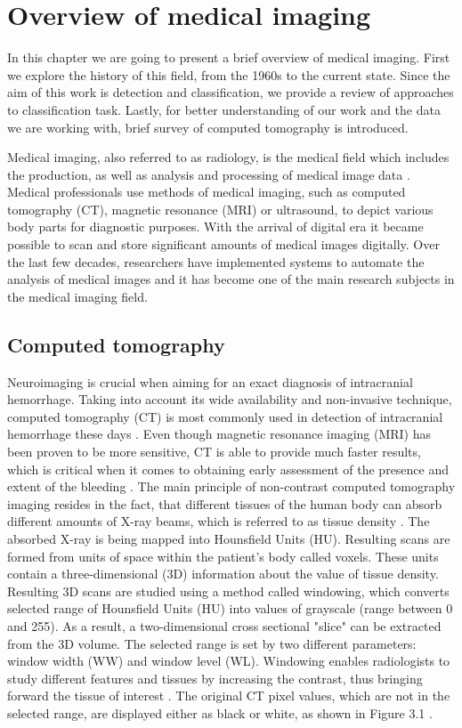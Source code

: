 \chapter{Overview of medical imaging}
In this chapter we are going to present a brief overview of medical imaging. First we explore the history of this field, from the 1960s to the current state. Since the aim of this work is detection and classification, we provide a review of approaches to classification task. Lastly, for better understanding of our work and the data we are working with, brief survey of computed tomography is introduced.

Medical imaging, also referred to as radiology, is the medical field which includes the production, as well as analysis and processing of medical image data \cite{diagnostic50years}. Medical professionals use methods of medical imaging, such as computed tomography (CT), magnetic resonance (MRI) or ultrasound, to depict various body parts for diagnostic purposes. With the arrival of digital era it became possible to scan and store significant amounts of medical images digitally. Over the last few decades, researchers have implemented systems to automate the analysis of medical images and it has become one of the main research subjects in the medical imaging field. 

\section{Computed tomography}
Neuroimaging is crucial when aiming for an exact diagnosis of intracranial hemorrhage.  Taking into account its wide availability and non-invasive technique, computed tomography (CT) is most commonly used in detection of intracranial hemorrhage these days \cite{imagingICH}. Even though magnetic resonance imaging (MRI) has been proven to be more sensitive, CT is able to provide much faster results, which is critical when it comes to obtaining early assessment of the presence and extent of the bleeding \cite{imagingAfterBrainInjury}. The main principle of non-contrast computed tomography imaging resides in the fact, that different tissues of the human body can absorb different amounts of X-ray beams, which is referred to as tissue density \cite{principlesOfCT}. The absorbed X-ray is being mapped into Hounsfield Units (HU). Resulting scans are formed from units of space within the patient's body called voxels. These units contain a three-dimensional (3D) information about the value of tissue density. Resulting 3D scans are studied using a method called windowing, which converts selected range of Hounsfield Units (HU) into values of grayscale (range between 0 and 255).  As a result, a two-dimensional cross sectional "slice" can be extracted from the 3D volume. The selected range is set by two different parameters: window width (WW) and window level (WL). Windowing enables radiologists to study different features and tissues by increasing the contrast, thus bringing forward the tissue of interest \cite{windowClassBiomArt}. The original CT pixel values, which are not in the selected range, are displayed either as black or white, as shown in Figure 3.1 .

